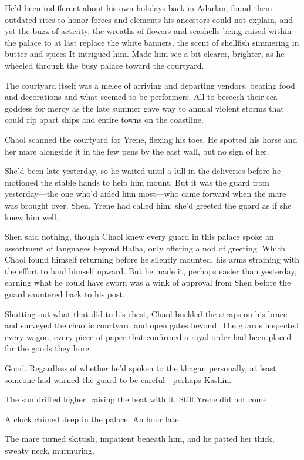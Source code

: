 He'd been indifferent about his own holidays back in Adarlan, found them outdated rites to honor forces and elements his ancestors could not explain, and yet the buzz of activity, the wreaths of flowers and seashells being raised within the palace to at last replace the white banners, the scent of shellfish simmering in butter and spices 
It intrigued him. Made him see a bit clearer, brighter, as he wheeled through the busy palace toward the courtyard.

The courtyard itself was a melee of arriving and departing vendors, bearing food and decorations and what seemed to be performers. All to beseech their sea goddess for mercy as the late summer gave way to annual violent storms that could rip apart ships and entire towns on the coastline.

Chaol scanned the courtyard for Yrene, flexing his toes. He spotted his horse and her mare alongside it in the few pens by the east wall, but
 no sign of her.

She'd been late yesterday, so he waited until a lull in the deliveries before he motioned the stable hands to help him mount. But it was the guard from yesterday---the one who'd aided him most---who came forward when the mare was brought over. Shen, Yrene had called him; she'd greeted the guard as if she knew him well.

Shen said nothing, though Chaol knew every guard in this palace spoke an assortment of languages beyond Halha, only offering a nod of greeting. Which Chaol found himself returning before he silently mounted, his arms straining with the effort to haul himself upward. But he made it, perhaps easier than yesterday, earning what he could have sworn was a wink of approval from Shen before the guard sauntered back to his post.

Shutting out what that did to his chest, Chaol buckled the straps on his brace and surveyed the chaotic courtyard and open gates beyond. The guards inspected every wagon, every piece of paper that confirmed a royal order had been placed for the goods they bore.

Good. Regardless of whether he'd spoken to the khagan personally, at least someone had warned the guard to be careful---perhaps Kashin.

The sun drifted higher, raising the heat with it. Still Yrene did not come.

A clock chimed deep in the palace. An hour late.

The mare turned skittish, impatient beneath him, and he patted her thick, sweaty neck, murmuring.

